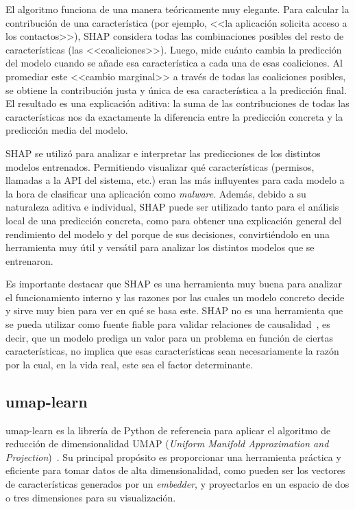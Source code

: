 El algoritmo funciona de una manera teóricamente muy elegante. Para calcular la contribución de una característica (por ejemplo, <<la aplicación solicita acceso a los contactos>>), SHAP considera todas las combinaciones posibles del resto de características (las <<coaliciones>>). Luego, mide cuánto cambia la predicción del modelo cuando se añade esa característica a cada una de esas coaliciones. Al promediar este <<cambio marginal>> a través de todas las coaliciones posibles, se obtiene la contribución justa y única de esa característica a la predicción final. El resultado es una explicación aditiva: la suma de las contribuciones de todas las características nos da exactamente la diferencia entre la predicción concreta y la predicción media del modelo.

SHAP se utilizó para analizar e interpretar las predicciones de los distintos modelos entrenados. Permitiendo visualizar qué características (permisos, llamadas a la API del sistema, etc.) eran las más influyentes para cada modelo a la hora de clasificar una aplicación como \textit{malware}. Además, debido a su naturaleza aditiva e individual, SHAP puede ser utilizado tanto para el análisis local de una predicción concreta, como para obtener una explicación general del rendimiento del modelo y del porque de sus decisiones, convirtiéndolo en una herramienta muy útil y versátil para analizar los distintos modelos que se entrenaron.

Es importante destacar que SHAP es una herramienta muy buena para analizar el funcionamiento interno y las razones por las cuales un modelo concreto decide y sirve muy bien para ver en qué se basa este. SHAP no es una herramienta que se pueda utilizar como fuente fiable para validar relaciones de causalidad~\cite{shapNotCausal}, es decir, que un modelo prediga un valor para un problema en función de ciertas características, no implica que esas características sean necesariamente la razón por la cual, en la vida real, este sea el factor determinante. 

\subsection{umap-learn}

umap-learn es la librería de Python de referencia para aplicar el algoritmo de reducción de dimensionalidad UMAP (\textit{Uniform Manifold Approximation and Projection})~\cite{mcinnes2018umap-learn}. Su principal propósito es proporcionar una herramienta práctica y eficiente para tomar datos de alta dimensionalidad, como pueden ser los vectores de características generados por un \textit{embedder}, y proyectarlos en un espacio de dos o tres dimensiones para su visualización.

